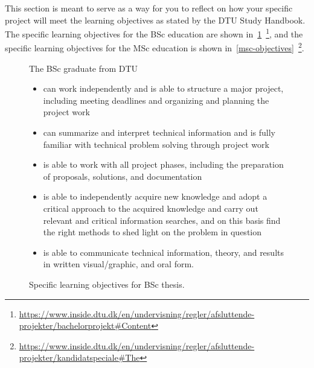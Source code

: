 \documentclass{article}
\begin{document}
This section is meant to serve as a way for you to reflect on how your specific project will meet the learning objectives as stated by the DTU Study Handbook.
The specific learning objectives for the BSc education are shown in~\cref{bsc-objectives}~\footnote{\url{https://www.inside.dtu.dk/en/undervisning/regler/afsluttende-projekter/bachelorprojekt\#Content}}, and the specific learning objectives for the MSc education is shown in~\cref{msc-objectives}~\footnote{\url{https://www.inside.dtu.dk/en/undervisning/regler/afsluttende-projekter/kandidatspeciale\#The}}.
\begin{figure}
    \begin{tcolorbox}[colframe=white]
    The BSc graduate from DTU
    \begin{itemize}
        \item can work independently and is able to structure a major project, including meeting deadlines and organizing and planning the project work
        \item can summarize and interpret technical information and is fully familiar with technical problem solving through project work
        \item is able to work with all project phases, including the preparation of proposals, solutions, and documentation
        \item is able to independently acquire new knowledge and adopt a critical approach to the acquired knowledge and carry out relevant and critical information searches, and on this basis find the right methods to shed light on the problem in question
        \item is able to communicate technical information, theory, and results in written visual/graphic, and oral form.
    \end{itemize}
    \end{tcolorbox}
    \caption{Specific learning objectives for BSc thesis.}
    \label{bsc-objectives}
\end{figure}
\end{document}
